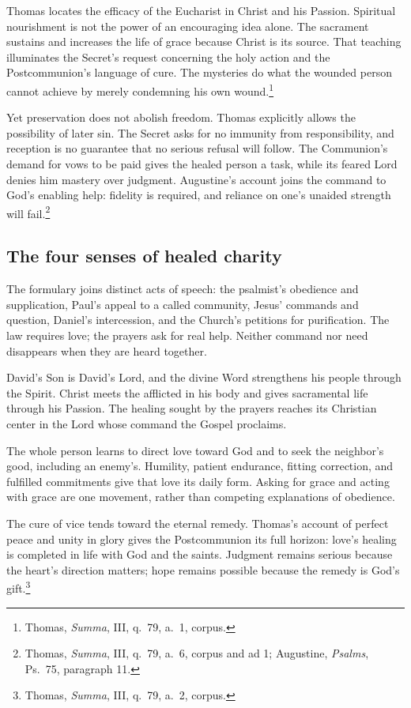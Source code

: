 Thomas locates the efficacy of the Eucharist in Christ and his Passion. Spiritual nourishment is not the power of an encouraging idea alone. The sacrament sustains and increases the life of grace because Christ is its source. That teaching illuminates the Secret's request concerning the holy action and the Postcommunion's language of cure. The mysteries do what the wounded person cannot achieve by merely condemning his own wound.\footnote{Thomas, \textit{Summa}, III, q.~79, a.~1, corpus.}

Yet preservation does not abolish freedom. Thomas explicitly allows the possibility of later sin. The Secret asks for no immunity from responsibility, and reception is no guarantee that no serious refusal will follow. The Communion's demand for vows to be paid gives the healed person a task, while its feared Lord denies him mastery over judgment. Augustine's account joins the command to God's enabling help: fidelity is required, and reliance on one's unaided strength will fail.\footnote{Thomas, \textit{Summa}, III, q.~79, a.~6, corpus and ad 1; Augustine, \textit{Psalms}, Ps.~75, paragraph 11.}

\subsection{The four senses of healed charity}
\begin{fourSenses}
\item[Literal.] The formulary joins distinct acts of speech: the psalmist's obedience and supplication, Paul's appeal to a called community, Jesus' commands and question, Daniel's intercession, and the Church's petitions for purification. The law requires love; the prayers ask for real help. Neither command nor need disappears when they are heard together.

\item[Allegorical.] David's Son is David's Lord, and the divine Word strengthens his people through the Spirit. Christ meets the afflicted in his body and gives sacramental life through his Passion. The healing sought by the prayers reaches its Christian center in the Lord whose command the Gospel proclaims.

\item[Moral.] The whole person learns to direct love toward God and to seek the neighbor's good, including an enemy's. Humility, patient endurance, fitting correction, and fulfilled commitments give that love its daily form. Asking for grace and acting with grace are one movement, rather than competing explanations of obedience.

\item[Anagogical.] The cure of vice tends toward the eternal remedy. Thomas's account of perfect peace and unity in glory gives the Postcommunion its full horizon: love's healing is completed in life with God and the saints. Judgment remains serious because the heart's direction matters; hope remains possible because the remedy is God's gift.\footnote{Thomas, \textit{Summa}, III, q.~79, a.~2, corpus.}
\end{fourSenses}
